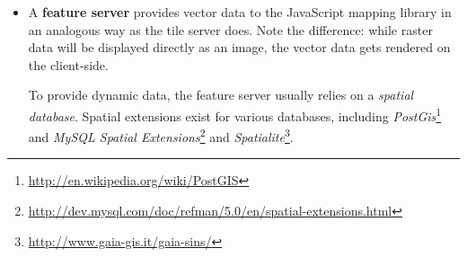 \begin{itemize}
\item A \textbf{feature server} provides vector data to the JavaScript mapping library in an analogous way as the tile server does. Note the difference: while raster data will be displayed directly as an image, the vector data gets rendered on the client-side.

To provide dynamic data, the feature server usually relies on a \textit{spatial database}. Spatial extensions exist for various databases, including \textit{PostGis}\footnote{\url{http://en.wikipedia.org/wiki/PostGIS}} and \textit{MySQL Spatial Extensions}\footnote{\url{http://dev.mysql.com/doc/refman/5.0/en/spatial-extensions.html}} and \textit{Spatialite}\footnote{\url{http://www.gaia-gis.it/gaia-sins/}}.

\end{itemize}










